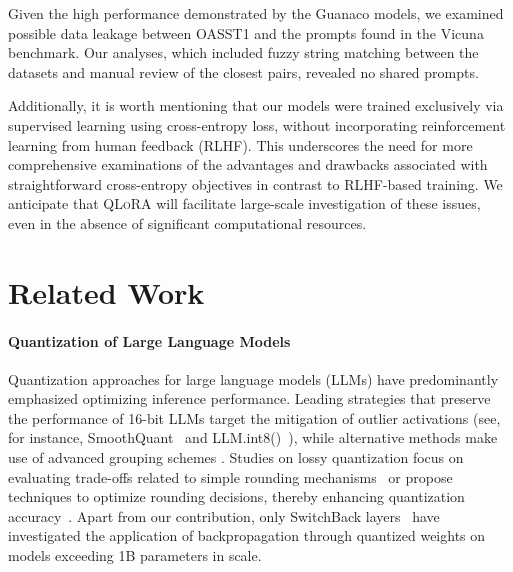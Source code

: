 Given the high performance demonstrated by the {Guanaco} models, we examined possible data leakage between OASST1 and the prompts found in the Vicuna benchmark. Our analyses, which included fuzzy string matching between the datasets and manual review of the closest pairs, revealed no shared prompts.

Additionally, it is worth mentioning that our models were trained exclusively via supervised learning using cross-entropy loss, without incorporating reinforcement learning from human feedback (RLHF). This underscores the need for more comprehensive examinations of the advantages and drawbacks associated with straightforward cross-entropy objectives in contrast to RLHF-based training. We anticipate that \textsc{QLoRA} will facilitate large-scale investigation of these issues, even in the absence of significant computational resources.

\section{Related Work}

\paragraph{Quantization of Large Language Models} Quantization approaches for large language models (LLMs) have predominantly emphasized optimizing inference performance. Leading strategies that preserve the performance of 16-bit LLMs target the mitigation of outlier activations (see, for instance, SmoothQuant~\citep{xiao2022smoothquant} and LLM.int8()~\citep{dettmers2022llm}), while alternative methods make use of advanced grouping schemes \citep{park2022nuqmm, yao2022zeroquant}. Studies on lossy quantization focus on evaluating trade-offs related to simple rounding mechanisms~\citep{dettmers2022case,zeng2022glm,pope2022efficiently} or propose techniques to optimize rounding decisions, thereby enhancing quantization accuracy~\citep{frantar2022gptq}. Apart from our contribution, only SwitchBack layers~\citep{wortsman2023stable} have investigated the application of backpropagation through quantized weights on models exceeding 1B parameters in scale.

